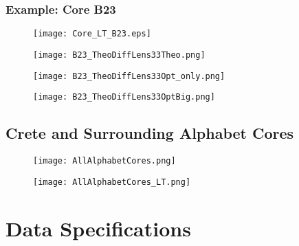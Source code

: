 \documentclass[../../CompleteThesis/Complete_1stDraft]{subfiles}
\begin{document}
\subsubsection[Core B23]{Example: Core B23}

\begin{figure}[h]
	\centering
	\texttt{[image: Core\_LT\_B23.eps]}
	\caption[]{}
	\label{fig:Core_LT_B23}
\end{figure}

\begin{figure}[h]
	\centering
	\texttt{[image: B23\_TheoDiffLens33Theo.png]}
	\caption[]{}
	\label{fig:B23_BD_Theo}
\end{figure}

\begin{figure}[h]
	\centering
	\texttt{[image: B23\_TheoDiffLens33Opt\_only.png]}
	\caption[]{}
	\label{fig:B23_BD_OptOnly}
\end{figure}

\begin{figure}[h]
	\centering
	\texttt{[image: B23\_TheoDiffLens33OptBig.png]}
	\caption[]{}
	\label{fig:B23_BD_OptBig}
\end{figure}


\subsection[Crete Area][Crete Area]{Crete and Surrounding Alphabet Cores}
\label{Subsec:Data_Selection_Alhabet}

\begin{figure}[h]
	\centering
	\texttt{[image: AllAlphabetCores.png]}
	\caption[]{}
	\label{fig:AllAlphabetCores}
\end{figure}

\begin{figure}[h]
	\centering
	\texttt{[image: AllAlphabetCores\_LT.png]}
	\caption[]{}
	\label{fig:AllAlphabetCores_LT}
\end{figure}


\section[Data Specifications][Data Specifications]{Data Specifications}
\label{Sec:Data_Specifications}
\end{document}
